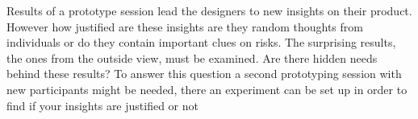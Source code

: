 \documentclass[Main.tex]{subfiles}
\begin{document}
Results of a prototype session lead the designers to new insights on their product. However how justified are these insights are they random thoughts from individuals or do they contain important clues on risks. The surprising results, the ones from the outside view, must be examined. Are there hidden needs behind these results? To answer this question a second prototyping session with new participants might be needed, there an experiment can be set up in order to find if your insights are justified or not
\end{document}
